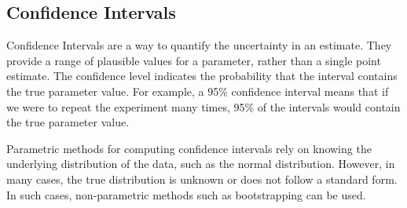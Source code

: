 



\subsection{Confidence Intervals}\label{section:confidence-intervals}
Confidence Intervals are a way to quantify the uncertainty in an estimate. They provide a range of plausible values for a parameter, rather than a single point estimate. The confidence level indicates the probability that the interval contains the true parameter value. For example, a 95\% confidence interval means that if we were to repeat the experiment many times, 95\% of the intervals would contain the true parameter value.

Parametric methods for computing confidence intervals rely on knowing the underlying distribution of the data, such as the normal distribution. However, in many cases, the true distribution is unknown or does not follow a standard form. In such cases, non-parametric methods such as bootstrapping can be used.


